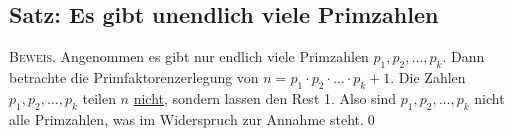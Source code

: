 \subsection[Unendlichkeitssatz der Primzahlen]{Satz: Es gibt unendlich viele Primzahlen}

	\textsc{Beweis.} Angenommen es gibt nur endlich viele Primzahlen $p_1,p_2,\dots,p_k$. 
	Dann betrachte die Primfaktorenzerlegung von $n=p_1\cdot p_2\cdot\ldots\cdot p_k +1$. 
	Die Zahlen $p_1,p_2,\dots,p_k$ teilen $n$ \underline{nicht}, sondern lassen den Rest 1. 
	Also sind $p_1,p_2,\dots,p_k$ nicht alle Primzahlen, was im Widerspruch zur Annahme
	steht.\qed
